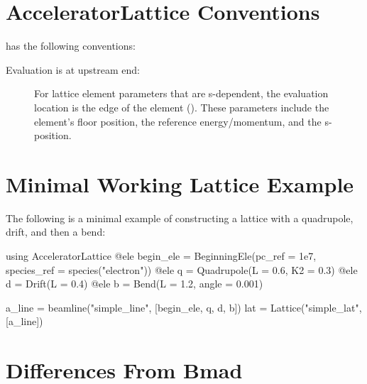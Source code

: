 \section{AcceleratorLattice Conventions}
\label{s:conventions}

\accellat has the following conventions:
\begin{description}
%
\item[Evaluation is at upstream end:] 
For lattice element parameters that are s-dependent, the evaluation location is the
 edge of the element (). These parameters include the 
element's floor position, the reference energy/momentum, and the s-position.
%
\end{description}

\section{Minimal Working Lattice Example}
\label{s:min.lat}

The following is a minimal example of constructing a lattice with a quadrupole, drift, and then
a bend:
\begin{example}
  using AcceleratorLattice
  @ele begin_ele = BeginningEle(pc_ref = 1e7, species_ref = species("electron"))
  @ele q = Quadrupole(L = 0.6, K2 = 0.3)
  @ele d = Drift(L = 0.4)
  @ele b = Bend(L = 1.2, angle = 0.001)

  a_line = beamline("simple_line", [begin_ele, q, d, b])
  lat = Lattice("simple_lat", [a_line])
\end{example}

\section{Differences From Bmad}

